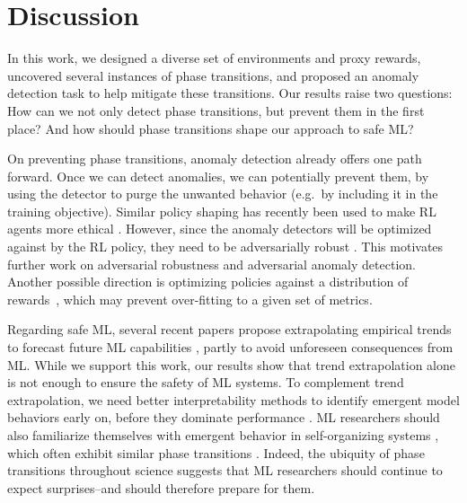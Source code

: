 \section{Discussion}


In this work, we designed a diverse set of environments and proxy rewards, uncovered several instances of phase transitions, and proposed an anomaly detection task to help mitigate these transitions. Our results raise two questions: How can we not only detect phase transitions, but prevent them in the first place? And how should phase transitions shape our approach to safe ML?

On preventing phase transitions, anomaly detection already offers one path forward. Once we can detect anomalies, we can potentially prevent them, by using the detector 
to purge the unwanted behavior (e.g.~by including it in the training objective). Similar policy shaping has recently been used to 
make RL agents more ethical \citep{hendrycks2021would}. However, since the anomaly detectors will be optimized against by the RL policy, they need to be adversarially robust \citep{goodfellow2014explaining}. This motivates further work on adversarial robustness and adversarial anomaly detection. Another possible direction is optimizing policies against a distribution of rewards~\citep{brown2019bayesianrex,javed2021pgbroil}, which may prevent over-fitting to a given set of metrics.

Regarding safe ML, several recent papers propose extrapolating empirical trends to forecast future ML capabilities \citep{kaplan2020scaling,hernandez2021scaling,droppo2021scaling}, partly to avoid unforeseen consequences from ML. While we support this work, our results show that trend extrapolation alone is not enough to ensure the safety of ML systems. To complement trend extrapolation, we need better interpretability methods to identify emergent model behaviors early on, before they dominate performance \citep{olah2018building}. ML researchers should also familiarize themselves with emergent behavior in self-organizing systems \citep{yates2012self}, which often exhibit similar phase transitions \citep{anderson1972more}. Indeed, the ubiquity of phase transitions throughout science suggests that ML researchers should continue to expect surprises--and should therefore prepare for them.

